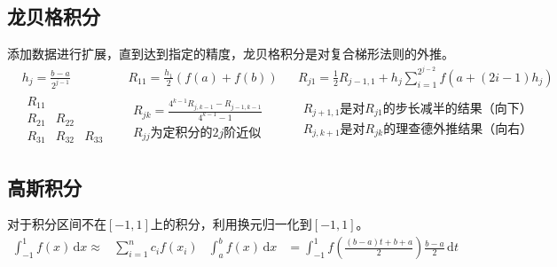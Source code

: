 \documentclass[twocolumn]{article}
\begin{document}
\subsection{龙贝格积分}
添加数据进行扩展，直到达到指定的精度，龙贝格积分是对复合梯形法则的外推。
\begin{align*}
    &h_j=\frac{b-a}{2^{j-1}} && R_{11}=\frac{h_1}{2}(f(a)+f(b)) && R_{j1}=\frac{1}{2}R_{j-1,1}+h_j\sum_{i=1}^{2^{j-2}}f(a+(2i-1)h_j)\\
     & \begin{matrix}
        R_{11} &        &        \\
        R_{21} & R_{22} &        \\
        R_{31} & R_{32} & R_{33}
    \end{matrix}
     &                            &
    \begin{matrix}
        R_{jk}=\frac{4^{k-1}R_{j,k-1}-R_{j-1,k-1}}{4^{k-1}-1} \\
        R_{jj}\text{为定积分的}2j\text{阶近似}
    \end{matrix}
     &&
    \begin{matrix}
        R_{j+1,1}\text{是对}R_{j1}\text{的步长减半的结果（向下）} \\
        R_{j,k+1}\text{是对}R_{jk}\text{的理查德外推结果（向右）}
    \end{matrix}
\end{align*}

\subsection{高斯积分}
对于积分区间不在$[-1,1]$上的积分，利用换元归一化到$[-1,1]$。
\begin{align*}
    \int_{-1}^{1} f(x) \,\mathrm{d}x \approx & \sum_{i=1}^{n}c_if(x_i) & \int_{a}^{b} f(x) \,\mathrm{d}x & = \int_{-1}^{1} f\left( \frac{(b-a)t+b+a}{2} \right)\frac{b-a}{2} \,\mathrm{d}t
\end{align*}
\end{document}
